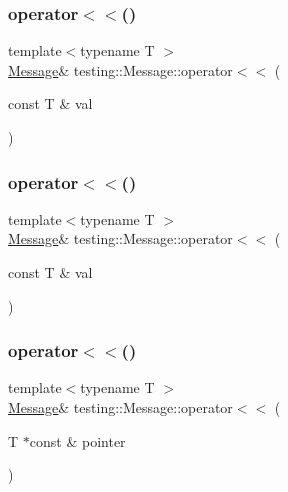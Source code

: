 \mbox{\label{classtesting_1_1_message_a2e0e71be52d54c20a75a55fca812721f}} 
\subsubsection{\texorpdfstring{operator$<$$<$()}{operator<<()}\hspace{0.1cm}{\footnotesize\ttfamily [2/18]}}
{\footnotesize\ttfamily template$<$typename T $>$ \\
\mbox{\hyperlink{classtesting_1_1_message}{Message}}\& testing\+::\+Message\+::operator$<$$<$ (\begin{DoxyParamCaption}\item[{const T \&}]{val }\end{DoxyParamCaption})\hspace{0.3cm}{\ttfamily [inline]}}

\mbox{\label{classtesting_1_1_message_a2e0e71be52d54c20a75a55fca812721f}} 
\subsubsection{\texorpdfstring{operator$<$$<$()}{operator<<()}\hspace{0.1cm}{\footnotesize\ttfamily [3/18]}}
{\footnotesize\ttfamily template$<$typename T $>$ \\
\mbox{\hyperlink{classtesting_1_1_message}{Message}}\& testing\+::\+Message\+::operator$<$$<$ (\begin{DoxyParamCaption}\item[{const T \&}]{val }\end{DoxyParamCaption})\hspace{0.3cm}{\ttfamily [inline]}}

\mbox{\label{classtesting_1_1_message_aa3ab685879958f90d2d8cd5b68d10c34}} 
\subsubsection{\texorpdfstring{operator$<$$<$()}{operator<<()}\hspace{0.1cm}{\footnotesize\ttfamily [4/18]}}
{\footnotesize\ttfamily template$<$typename T $>$ \\
\mbox{\hyperlink{classtesting_1_1_message}{Message}}\& testing\+::\+Message\+::operator$<$$<$ (\begin{DoxyParamCaption}\item[{T $\ast$const \&}]{pointer }\end{DoxyParamCaption})\hspace{0.3cm}{\ttfamily [inline]}}

